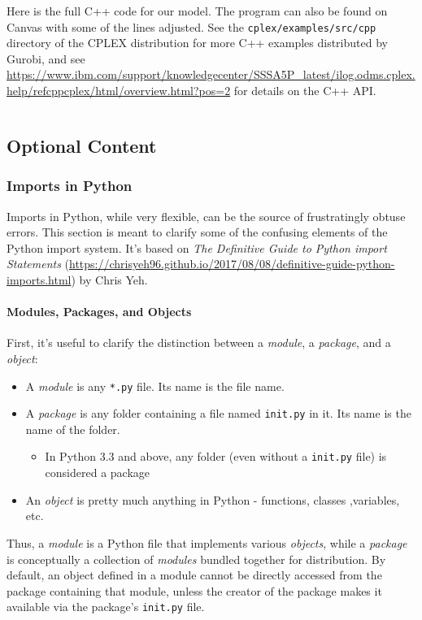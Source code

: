 \documentclass[12pt]{article}
\begin{document}
Here is the full C++ code for our model. The program can also be found on Canvas with some of the lines adjusted. See the \texttt{cplex/examples/src/cpp} directory of the CPLEX distribution for more C++ examples distributed by Gurobi, and see \url{https://www.ibm.com/support/knowledgecenter/SSSA5P_latest/ilog.odms.cplex.help/refcppcplex/html/overview.html?pos=2} for details on the C++ API.
\inputminted[fontsize=\small,linenos]{cpp}{code/shortlines/twtcplex.cpp}

\subsection{Optional Content}
\subsubsection{Imports in Python}
Imports in Python, while very flexible, can be the source of frustratingly obtuse errors. This section is meant to clarify some of the confusing elements of the Python import system. It's based on \emph{The Definitive Guide to Python import Statements} (\url{https://chrisyeh96.github.io/2017/08/08/definitive-guide-python-imports.html}) by Chris Yeh.

\paragraph{Modules, Packages, and Objects}
First, it's useful to clarify the distinction between a \emph{module}, a \emph{package}, and a \emph{object}:
\begin{itemize}
    \item A \emph{module} is any \texttt{*.py} file. Its name is the file name.
    \item A \emph{package} is any folder containing a file named \texttt{\ttul\ttul init\ttul\ttul.py} in it. Its name is the name of the folder.
        \begin{itemize}
            \item In Python 3.3 and above, any folder (even without a \texttt{\ttul\ttul init\ttul\ttul.py} file) is considered a package
        \end{itemize}
    \item An \emph{object} is pretty much anything in Python - functions, classes ,variables, etc.
\end{itemize}
Thus, a \emph{module} is a Python file that implements various \emph{objects}, while a \emph{package} is conceptually a collection of \emph{modules} bundled together for distribution. By default, an object defined in a module cannot be directly accessed from the package containing that module, unless the creator of the package makes it available via the package's \texttt{\ttul\ttul init\ttul\ttul.py} file.
\end{document}
